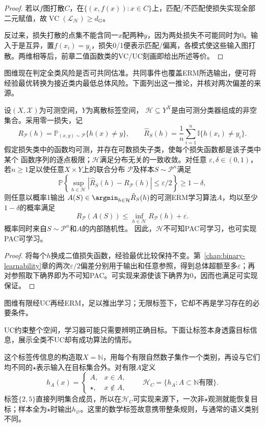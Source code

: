 \begin{proof}
若以$f$图打散$C$，在$\{(x,f(x)):x\in C\}$上，匹配/不匹配使损失实现全部二元赋值，故$\operatorname{VC}(\mathcal L_{\mathcal H})\geq d_G$。

反过来，损失打散的点集不能含同一$x$配两种$y$，因为两处损失不可能同时为0。输入于是互异，置$f(x_i)=y_i$，损失0/1便表示匹配/偏离，各模式使这些输入图打散。两维相等后，前章二值函数类的VC/UC刻画即给出所述等价。
\end{proof}

图维现在判定全类风险是否可共同估准。共同事件也覆盖ERM所选输出，便可将经验最优转换为接近类内最低总体风险。下面列出这一推论，并核对两次偏差的来源。

\begin{theorem}[一致收敛推出可学习性]
\label{thm:multiclass-uniform-pac}
设$(X,\mathcal X)$为可测空间，$Y$为离散标签空间，
$\mathcal H\subseteq Y^X$是由可测分类器组成的非空集合。采用零一损失，记
\[
 R_{\mathcal P}(h)=\mathbb P_{(x,y)\sim\mathcal P}\{h(x)\neq y\},\qquad
 \hat R_S(h)=\frac1n\sum_{i=1}^n\mathbb I\{h(x_i)\neq y_i\}.
\]
假定损失类中的函数均可测，并存在可数损失子类，使每个损失函数都是该子类中某个
函数序列的逐点极限；$\mathcal H$满足分布无关的一致收敛。对任意
$\varepsilon,\delta\in(0,1)$，若$n\geq1$足以使任意$X\times Y$上的联合分布
$\mathcal P$及样本$S\sim\mathcal P^n$满足
\[
 \mathbb P\!\left\{
 \sup_{h\in\mathcal H}|\hat R_S(h)-R_{\mathcal P}(h)|\leq\varepsilon/2
 \right\}\geq1-\delta,
\]
则任意以概率1输出
$A(S)\in\argmin_{h\in\mathcal H}\hat R_S(h)$的可测ERM学习算法$A$，均以至少
$1-\delta$的概率满足
\[
 R_{\mathcal P}(A(S))\leq\inf_{h\in\mathcal H}R_{\mathcal P}(h)+\varepsilon.
\]
概率同时来自$S\sim\mathcal P^n$和$A$的内部随机性。
因此，$\mathcal H$不可知PAC可学习，也可实现PAC可学习。
\end{theorem}

\begin{proof}
将每个$h$换成二值损失函数，经验最优比较保持不变。第~\ref{chap:binary-learnability}章的两次$\varepsilon/2$偏差分别用于输出和任意参照，得到总体超额至多$\varepsilon$；再对参照取下确界即为不可知PAC。可实现来源使该下确界为0，因而也满足可实现保证。
\end{proof}

图维有限经UC再经ERM，足以推出学习；无限标签下，它却不再是学习存在的必要条件。

UC约束整个空间，学习器可能只需要辨明正确目标。下面让标签本身透露目标信息，展示全类不UC却有成功算法的情形。

这个标签传信息的构造取$X=\mathbb N$，用每个有限自然数子集作一个类别，再设与它们均不同的$\star$表示输入在目标集合外。对有限$A$定义
\begin{equation}
 h_A(x)=\begin{cases}A,&x\in A,\\\star,&x\notin A,\end{cases}
 \qquad\mathcal H_C=\{h_A:A\subset\mathbb N\text{有限}\}.
 \label{eq:cantor-class}
\end{equation}
标签$\{2,5\}$直接列明集合成员，所以在$\mathcal H_C$可实现来源下，一次非$\star$观测就能恢复目标；样本全为$\star$时输出$h_{\varnothing}$。这里的数学标签故意携带整条规则，与通常的语义类别不同。


